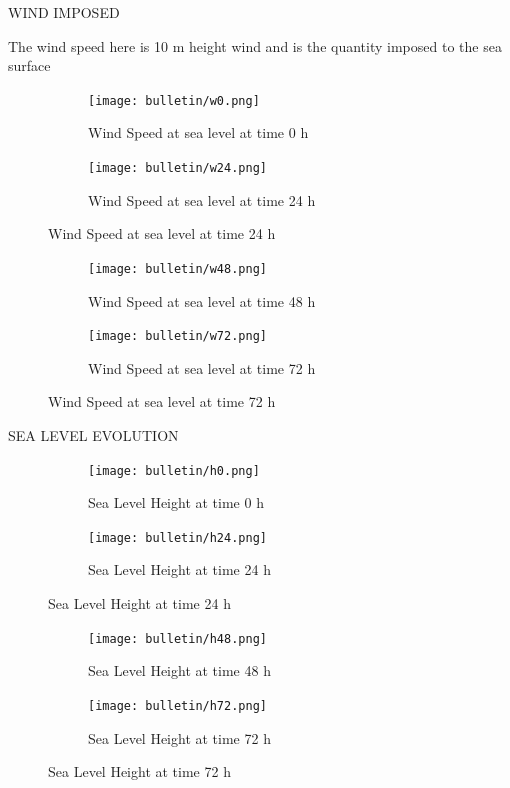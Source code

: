 \documentclass[a4paper]{article}
\renewcommand{\\}{\ {\large\textperiodcentered}\ }
\renewcommand{\\}{\ {\large\textperiodcentered}\ }
\begin{document}
\newpage

WIND IMPOSED 

The wind speed here is 10 m height wind and is the quantity imposed to the sea surface

\begin{figure}[h]
\centering
\begin{subfigure}{.5\textwidth}
  \centering
  \texttt{[image: bulletin/w0.png]}
  \caption*{Wind Speed at sea level at time 0 h}
  \label{fig:sub1}
\end{subfigure}%
\begin{subfigure}{.5\textwidth}
  \centering
  \texttt{[image: bulletin/w24.png]}
  \caption*{Wind Speed at sea level at time 24 h}
  \label{fig:sub2}
\end{subfigure}
\label{fig:test}

\end{figure}


\begin{figure}[h]
\centering
\begin{subfigure}{.5\textwidth}
  \centering
  \texttt{[image: bulletin/w48.png]}
  \caption*{Wind Speed at sea level at time 48 h}
  \label{fig:sub1}
\end{subfigure}%
\begin{subfigure}{.5\textwidth}
  \centering
  \texttt{[image: bulletin/w72.png]}
  \caption*{Wind Speed at sea level at time 72 h}
  \label{fig:sub2}
\end{subfigure}
\label{fig:test}

\end{figure}

\newpage

SEA LEVEL EVOLUTION


\begin{figure}[h]
\centering
\begin{subfigure}{.5\textwidth}
  \centering
  \texttt{[image: bulletin/h0.png]}
  \caption*{Sea Level Height at time 0 h}
  \label{fig:sub1}
\end{subfigure}%
\begin{subfigure}{.5\textwidth}
  \centering
  \texttt{[image: bulletin/h24.png]}
  \caption*{Sea Level Height at time 24 h}
  \label{fig:sub2}
\end{subfigure}
\label{fig:test}

\end{figure}


\begin{figure}[h]
\centering
\begin{subfigure}{.5\textwidth}
  \centering
  \texttt{[image: bulletin/h48.png]}
  \caption*{Sea Level Height at time 48 h}
  \label{fig:sub1}
\end{subfigure}%
\begin{subfigure}{.5\textwidth}
  \centering
  \texttt{[image: bulletin/h72.png]}
  \caption*{Sea Level Height at time 72 h}
  \label{fig:sub2}
\end{subfigure}
\label{fig:test}

\end{figure}
\end{document}
